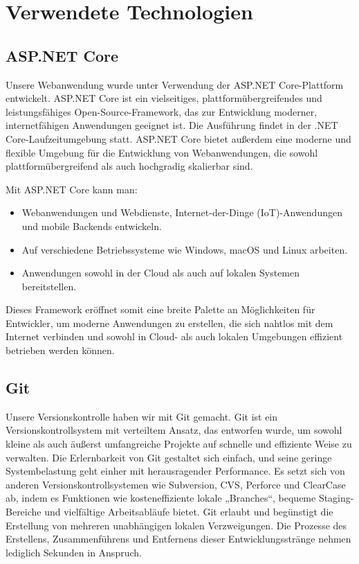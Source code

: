 \section{Verwendete Technologien}
\label{sec:tech}

\subsection*{ASP.NET Core}

Unsere Webanwendung wurde unter Verwendung der ASP.NET Core-Plattform entwickelt. 
ASP.NET Core ist ein vielseitiges, plattformübergreifendes und leistungsfähiges 
Open-Source-Framework, das zur Entwicklung moderner, internetfähigen Anwendungen geeignet ist. 
Die Ausführung findet in der .NET Core-Laufzeitumgebung statt.
ASP.NET Core bietet außerdem eine moderne und flexible Umgebung für die Entwicklung von Webanwendungen, 
die sowohl plattformübergreifend als auch hochgradig skalierbar sind. \cite{asp_dotnetcore}

Mit ASP.NET Core kann man:

\begin{itemize}

\item Webanwendungen und Webdienste, Internet-der-Dinge (IoT)-Anwendungen und 
mobile Backends entwickeln.
\item Auf verschiedene Betriebssysteme wie Windows, macOS und Linux arbeiten.
\item Anwendungen sowohl in der Cloud als auch auf lokalen Systemen bereitstellen.
\end{itemize}

Dieses Framework eröffnet somit eine breite Palette an Möglichkeiten für Entwickler, 
um moderne Anwendungen zu erstellen, die sich nahtlos mit dem Internet verbinden und 
sowohl in Cloud- als auch lokalen Umgebungen effizient betrieben werden können. \cite{asp_dotnetcore}
\newpage

\subsection*{Git}

Unsere Versionskontrolle haben wir mit Git gemacht. Git ist ein Versionskontrollsystem 
mit verteiltem Ansatz, das entworfen wurde, um sowohl kleine als auch äußerst 
umfangreiche Projekte auf schnelle und effiziente Weise zu verwalten.
Die Erlernbarkeit von Git gestaltet sich einfach, und seine geringe Systembelastung 
geht einher mit herausragender Performance. Es setzt sich von anderen Versionskontrollsystemen 
wie Subversion, CVS, Perforce und ClearCase ab, indem es Funktionen wie kosteneffiziente 
lokale „Branches“, bequeme Staging-Bereiche und vielfältige Arbeitsabläufe bietet.
Git erlaubt und begünstigt die Erstellung von mehreren unabhängigen lokalen Verzweigungen. 
Die Prozesse des Erstellens, Zusammenführens und Entfernens dieser Entwicklungsstränge 
nehmen lediglich Sekunden in Anspruch. \cite{git_introduction} \\

